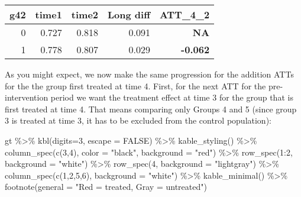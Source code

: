\documentclass[
]{article}
\newenvironment{Shaded}{\begin{snugshade}}{\end{snugshade}}
\newcommand{\AttributeTok}[1]{\textcolor[rgb]{0.77,0.63,0.00}{#1}}
\newcommand{\ConstantTok}[1]{\textcolor[rgb]{0.00,0.00,0.00}{#1}}
\newcommand{\DecValTok}[1]{\textcolor[rgb]{0.00,0.00,0.81}{#1}}
\newcommand{\FunctionTok}[1]{\textcolor[rgb]{0.00,0.00,0.00}{#1}}
\newcommand{\NormalTok}[1]{#1}
\newcommand{\SpecialCharTok}[1]{\textcolor[rgb]{0.00,0.00,0.00}{#1}}
\newcommand{\StringTok}[1]{\textcolor[rgb]{0.31,0.60,0.02}{#1}}
\begin{document}
\begin{table}
\centering
\begin{tabular}{r|r|r|r|>{}r}
\hline
g42 & time1 & time2 & Long diff & ATT\_4\_2\\
\hline
0 & 0.727 & 0.818 & 0.091 & \textbf{NA}\\
\hline
1 & 0.778 & 0.807 & 0.029 & \textbf{-0.062}\\
\hline
\end{tabular}
\end{table}

As you might expect, we now make the same progression for the addition
ATTs for the the group first treated at time 4. First, for the next ATT
for the pre-intervention period we want the treatment effect at time 3
for the group that is first treated at time 4. That means comparing only
Groups 4 and 5 (since group 3 is treated at time 3, it has to be
excluded from the control population):

\begin{Shaded}
\begin{Highlighting}[]
\NormalTok{gt }\SpecialCharTok{\%\textgreater{}\%}
  \FunctionTok{kbl}\NormalTok{(}\AttributeTok{digits=}\DecValTok{3}\NormalTok{, }\AttributeTok{escape =} \ConstantTok{FALSE}\NormalTok{) }\SpecialCharTok{\%\textgreater{}\%}
  \FunctionTok{kable\_styling}\NormalTok{() }\SpecialCharTok{\%\textgreater{}\%}
  \FunctionTok{column\_spec}\NormalTok{(}\FunctionTok{c}\NormalTok{(}\DecValTok{3}\NormalTok{,}\DecValTok{4}\NormalTok{), }\AttributeTok{color =} \StringTok{"black"}\NormalTok{, }\AttributeTok{background =} \StringTok{"red"}\NormalTok{) }\SpecialCharTok{\%\textgreater{}\%}
  \FunctionTok{row\_spec}\NormalTok{(}\DecValTok{1}\SpecialCharTok{:}\DecValTok{2}\NormalTok{, }\AttributeTok{background =} \StringTok{"white"}\NormalTok{) }\SpecialCharTok{\%\textgreater{}\%}
  \FunctionTok{row\_spec}\NormalTok{(}\DecValTok{4}\NormalTok{, }\AttributeTok{background =} \StringTok{"lightgray"}\NormalTok{) }\SpecialCharTok{\%\textgreater{}\%}
  \FunctionTok{column\_spec}\NormalTok{(}\FunctionTok{c}\NormalTok{(}\DecValTok{1}\NormalTok{,}\DecValTok{2}\NormalTok{,}\DecValTok{5}\NormalTok{,}\DecValTok{6}\NormalTok{), }\AttributeTok{background =} \StringTok{"white"}\NormalTok{) }\SpecialCharTok{\%\textgreater{}\%}
  \FunctionTok{kable\_minimal}\NormalTok{() }\SpecialCharTok{\%\textgreater{}\%}
  \FunctionTok{footnote}\NormalTok{(}\AttributeTok{general =} \StringTok{"Red = treated, Gray = untreated"}\NormalTok{)}
\end{Highlighting}
\end{Shaded}
\end{document}
